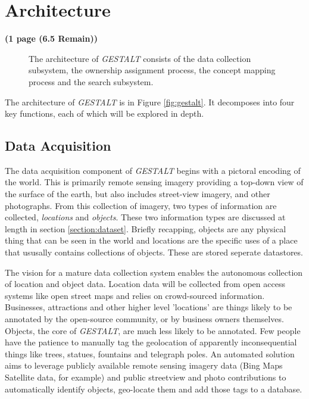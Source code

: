 \section{Architecture}
\label{section:architecture}
\textbf{(1 page (6.5 Remain))}

\begin{figure*}[t]
	\label{fig:architecture}
	
	\centering
	\caption[widht=\textwidth]{The architecture of \textit{GESTALT} consists of the data collection subsystem, the ownership assignment process, the concept mapping process and the search subsystem.}
\end{figure*}

The architecture of \textit{GESTALT} is in Figure \ref{fig:gestalt}. It decomposes into four key functions, each of which will be explored in depth. 

\subsection{Data Acquisition}
The data acquisition component of \textit{GESTALT} begins with a pictoral encoding of the world. 
This is primarily remote sensing imagery providing a top-down view of the surface of the earth, but also includes street-view imagery, and other photographs. 
From this collection of imagery, two types of information are collected, \textit{locations} and \textit{objects}. 
These two information types are discussed at length in section \ref{section:dataset}. 
Briefly recapping, objects are any physical thing that can be seen in the world and locations are the specific uses of a place that ususally contains collections of objects. 
These are stored seperate datastores. 

The vision for a mature data collection system enables the autonomous collection of location and object data. 
Location data will be collected from open access systems like open street maps and relies on crowd-sourced information. 
Businesses, attractions and other higher level 'locations' are things likely to be annotated by the open-source community, or by business owners themselves. 
Objects, the core of \textit{GESTALT}, are much less likely to be annotated. Few people have the patience to manually tag the geolocation of apparently inconsequential things like trees, statues, fountains and telegraph poles. 
An automated solution aims to leverage publicly available remote sensing imagery data (Bing Maps Satellite data, for example) and public streetview and photo contributions to automatically identify objects, geo-locate them and add those tags to a database. 

